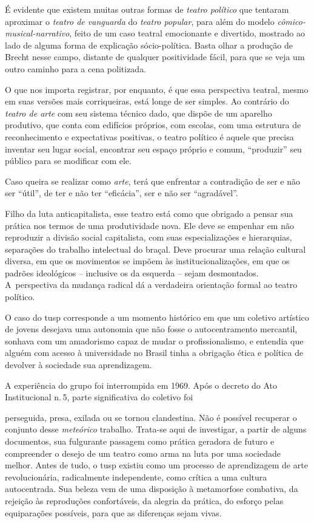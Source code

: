 É evidente que existem muitas outras formas de {\it teatro político} que
tentaram aproximar o {\it teatro de vanguarda} do {\it teatro popular},
para além do modelo {\it cômico-musical-narrativo}, feito de um caso
teatral emocionante e divertido, mostrado ao lado de alguma forma de
explicação sócio-política. Basta olhar a produção de Brecht nesse campo,
distante de qualquer positividade fácil, para que se veja um outro
caminho para a cena politizada.

O que nos importa registrar, por enquanto, é que essa perspectiva
teatral, mesmo em suas versões mais corriqueiras, está longe de ser
simples. Ao contrário do {\it teatro de arte} com seu sistema técnico
dado, que dispõe de um aparelho produtivo, que conta com edifícios
próprios, com escolas, com uma estrutura de reconhecimento e
expectativas positivas, o teatro político é aquele que precisa inventar
seu lugar social, encontrar seu espaço próprio e comum, “produzir” seu
público para se modificar com ele.

Caso queira se realizar como {\it arte}, terá que enfrentar a contradição
de ser e não ser “útil”, de ter e não ter “eficácia”, ser e não ser
“agradável”.

Filho da luta anticapitalista, esse teatro está como que obrigado
a pensar sua prática nos termos de uma produtividade nova. Ele deve se
empenhar em não reproduzir a divisão social capitalista, com suas
especializações e hierarquias, separações do trabalho intelectual do
braçal. Deve procurar uma relação cultural diversa, em que os movimentos
se impõem às institucionalizações, em que os padrões ideológicos --
inclusive os da esquerda -- sejam desmontados. A~perspectiva da mudança
radical dá a verdadeira orientação formal ao teatro político.

O caso do {\sc tusp} corresponde a um
momento histórico em que um coletivo artístico de jovens desejava uma
autonomia que não fosse o autocentramento mercantil, sonhava com um
amadorismo capaz de mudar o profissionalismo, e entendia que alguém com
acesso à universidade no Brasil tinha a obrigação ética e política de
devolver à sociedade sua aprendizagem.

A experiência do grupo foi interrompida em 1969. Após o decreto do
Ato Institucional n.\,5, parte significativa do coletivo foi

\column 

\noindent{}perseguida, presa, exilada ou se tornou clandestina. Não é possível
recuperar o conjunto desse {\it meteórico} trabalho. Trata-se aqui de
investigar, a partir de alguns documentos, sua fulgurante passagem como
prática geradora de futuro e compreender o desejo de um teatro como arma na luta por uma sociedade melhor. 
Antes de tudo, o {\sc tusp} existiu
como um processo de aprendizagem de arte revolucionária, radicalmente
independente, como crítica a uma cultura autocentrada. Sua beleza vem de
uma disposição à metamorfose combativa, da rejeição às reproduções
confortáveis, da alegria da prática, do esforço pelas equiparações
possíveis, para que as diferenças sejam vivas.

